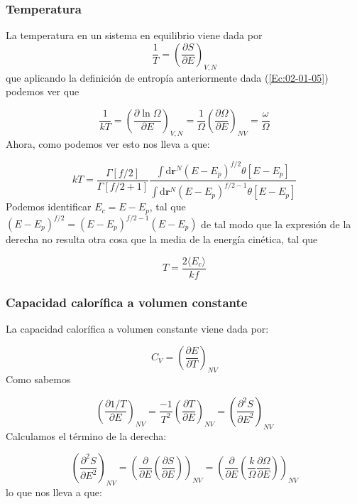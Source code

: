 \documentclass[11pt]{article} %
\newcommand{\parentesis}[1]{\left( #1  \right)}
\newcommand{\parciales}[2]{\frac{\partial #1}{\partial #2}}
\newcommand{\D}{\mathrm{d}}
\newcommand{\rn}{\mathbf{r}}
\begin{document}
\subsubsection{Temperatura}
La temperatura en un sistema en equilibrio viene dada por 
\begin{equation}
	\frac{1}{T} = \parentesis{\parciales{S}{E}}_{V,N}
\end{equation}
que aplicando la definición de entropía anteriormente dada (\ref{Ec:02-01-05}) podemos ver que

\begin{equation}
	\frac{1}{kT} = \parentesis{\parciales{\ln \Omega}{E}}_{V,N} =  \frac{1}{\Omega} \parentesis{\parciales{\Omega }{E}}_{NV} = \frac{\omega}{\Omega}
\end{equation}
Ahora, como podemos ver esto nos lleva a que: 

\begin{equation}
	kT = \frac{\Gamma[f/2]}{\Gamma[f/2+1]} \frac{\int \D \rn^N (E-E_p)^{f/2}\theta [E-E_p] }{\int \D \rn^N (E-E_p)^{f/2-1}\theta [E-E_p]}
\end{equation}
Podemos identificar $E_c = E - E_p$, tal que $(E-E_p)^{f/2} = (E-E_p)^{f/2-1} (E-E_p)$ de tal modo que la expresión de la derecha no resulta otra cosa que la media de la energía cinética, tal que 


\begin{equation}
	T = \frac{2 \langle E_c \rangle}{kf}
\end{equation}

\subsubsection{Capacidad calorífica a volumen constante}

La capacidad calorífica a volumen constante viene dada por:

\begin{equation}
	C_V = \parentesis{\parciales{E}{T}}_{NV}
\end{equation}
Como sabemos 

\begin{equation}
	\parentesis{\parciales{1/T}{E}}_{NV} = \frac{-1}{T^2} \parentesis{\parciales{T}{E}}_{NV} = \parentesis{\parciales{^2S}{E^2}}_{NV}
\end{equation}
Calculamos el término de la derecha:

\begin{equation}
	\parentesis{\parciales{^2S}{E^2}}_{NV} = \parentesis{ \parciales{}{E} \parentesis{\parciales{S}{E}}}_{NV} = \parentesis{\parciales{}{E} \parentesis{\frac{k}{\Omega}\parciales{\Omega}{E} }}_{NV}
\end{equation}
lo que nos lleva a que:
\end{document}
